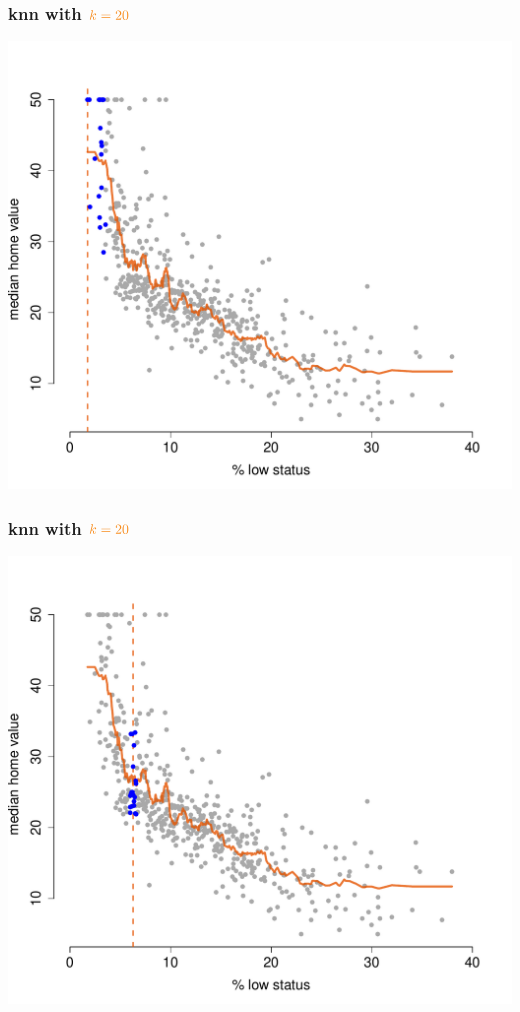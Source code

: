 \documentclass{beamer}
\newcommand{\bo}[1]{\textcolor{burntorange}{#1}}
\begin{document}
\begin{frame}[plain]
\frametitle{knn with $\bo{k=20}$}
\vspace{-8mm}
\begin{center}
\includegraphics[scale=.44]{DaveBostonplotk=20ii=1.pdf}
\end{center}
\end{frame}

\begin{frame}[plain]
\frametitle{knn with $\bo{k=20}$}
\vspace{-8mm}
\begin{center}
\includegraphics[scale=.44]{DaveBostonplotk=20ii=2.pdf}
\end{center}
\end{frame}
\end{document}

